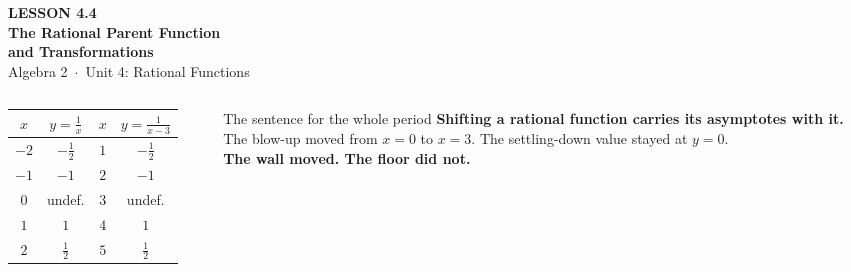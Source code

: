 \documentclass[aspectratio=169, 11pt]{beamer}
\begin{document}
{
\begin{frame}[plain]
  \vspace{2.8cm}\hspace{0.55cm}%
  \begin{minipage}{0.9\textwidth}
    {\color{goldacc}\bfseries\small LESSON 4.4}\\[0.5cm]
    {\color{white}\bfseries\LARGE The Rational Parent Function}\\[0.35cm]
    {\color{white}\bfseries\large and Transformations}\\[1.0cm]
    {\color{forestmid}\small Algebra 2~$\cdot$~Unit 4: Rational Functions}
  \end{minipage}
\end{frame}
}

\begin{frame}[t, plain]
  \begin{columns}[T]
    \begin{column}{0.52\textwidth}
      \centering
      \renewcommand{\arraystretch}{1.25}
      \begin{tabular}{|c|c||c|c|}
      \hline
      $x$ & $y=\frac1x$ & $x$ & $y=\frac{1}{x-3}$ \\ \hline
      $-2$ & $-\frac12$ & $1$ & $-\frac12$ \\ \hline
      $-1$ & $-1$       & $2$ & $-1$ \\ \hline
      $0$  & undef.     & $3$ & undef. \\ \hline
      $1$  & $1$        & $4$ & $1$ \\ \hline
      $2$  & $\frac12$  & $5$ & $\frac12$ \\ \hline
      \end{tabular}
    \end{column}
    \begin{column}{0.44\textwidth}
      \begin{block}{The sentence for the whole period}
        \textbf{Shifting a rational function carries its asymptotes with it.} \\[3pt]
        The blow-up moved from $x=0$ to $x=3$. The settling-down value stayed at $y=0$. \\[3pt]
        \textbf{The wall moved. The floor did not.}
      \end{block}
    \end{column}
  \end{columns}
\end{frame}
\end{document}
